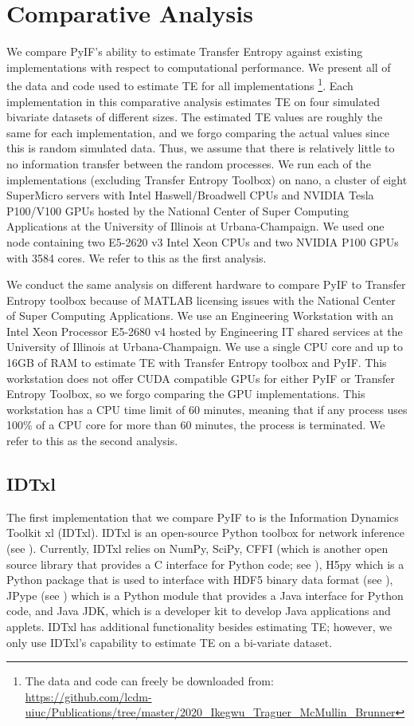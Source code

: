 \section{Comparative Analysis} \label{PyIF:CA}

We compare PyIF's ability to estimate Transfer Entropy against existing implementations with respect to computational performance. We present all of the data and code used to estimate TE for all implementations \footnote{The data and code can freely be downloaded from: \\  \url{https://github.com/lcdm-uiuc/Publications/tree/master/2020\_Ikegwu\_Traguer\_McMullin\_Brunner}}. Each implementation in this comparative analysis estimates TE on four simulated bivariate datasets of different sizes. The estimated TE values are roughly the same for each implementation, and we forgo comparing the actual values since this is random simulated data. Thus, we assume that there is relatively little to no information transfer between the random processes. We run each of the implementations (excluding Transfer Entropy Toolbox)  on nano, a cluster of eight SuperMicro servers with Intel Haswell/Broadwell CPUs and NVIDIA Tesla P100/V100 GPUs hosted by the National Center of Super Computing Applications at the University of Illinois at Urbana-Champaign. We used one node containing two E5-2620 v3 Intel Xeon CPUs and two NVIDIA P100 GPUs with 3584 cores.  We refer to this as the first analysis.

We conduct the same analysis on different hardware to compare PyIF to Transfer Entropy toolbox because of MATLAB licensing issues with the National Center of Super Computing Applications. We use an Engineering Workstation with an Intel Xeon Processor E5-2680 v4  hosted by Engineering IT shared services at the University of Illinois at Urbana-Champaign. We use a single CPU core and up to 16GB of RAM to estimate TE with Transfer Entropy toolbox and PyIF. This workstation does not offer CUDA compatible GPUs for either PyIF or Transfer Entropy Toolbox, so we forgo comparing the GPU implementations. This workstation has a CPU time limit of 60 minutes, meaning that if any process uses 100\% of a CPU core for more than 60 minutes, the process is terminated. We refer to this as the second analysis.

\subsection{IDTxl}
The first implementation that we compare PyIF to is the Information Dynamics Toolkit xl (IDTxl). IDTxl is an open-source Python toolbox for network inference (see \cite{IDTxl}). Currently, IDTxl relies on NumPy,  SciPy, CFFI (which is another open source library that provides a C interface for Python code; see \cite{cffi}),  H5py which is a Python package that is used to interface with HDF5 binary data format (see \cite{hdf5}),  JPype (see \cite{jpype}) which is a Python module that provides a Java interface for Python code, and Java JDK, which is a developer kit to develop Java applications and applets.  IDTxl has additional functionality besides estimating TE; however, we only use IDTxl's capability to estimate TE on a bi-variate dataset.


